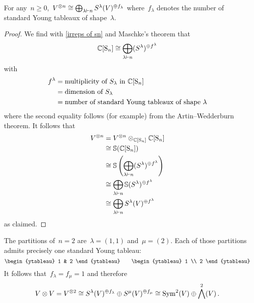 \documentclass[a4paper,10pt]{scrartcl}
\begin{document}
\begin{corollary}
  For any~$n \geq 0$,~$V^{\otimes n} \cong \bigoplus_{\lambda \vdash n} S^{\lambda}(V)^{\oplus f_\lambda}$ where~$f_\lambda$ denotes the number of standard Young tableaux of shape~$\lambda$.
\end{corollary}


\begin{proof}
  We find with \cref{irreps of sn} and Maschke’s theorem that
  \[
    \mathbb{C}[\operatorname{S}_n]
    \cong
    \bigoplus_{\lambda \vdash n} (S^\lambda)^{\oplus f^\lambda}
  \]
  with
  \begin{align*}
    f^\lambda
    &=
    \text{multiplicity of~$S_\lambda$ in~$\mathbb{C}[\operatorname{S}_n]$}
    \\
    &=
    \text{dimension of~$S_\lambda$}
    \\
    &=
    \text{number of standard Young tableaux of shape~$\lambda$}
  \end{align*}
  where the second equality follows (for example) from the Artin--Wedderburn theorem.
  It follows that
  \begin{align*}
    V^{\otimes n}
    &=
    V^{\otimes n} \otimes_{\mathbb{C}[\operatorname{S}_n]} \mathbb{C}[\operatorname{S}_n]
    \\
    &\cong
    \mathbb{S}(\mathbb{C}[\operatorname{S}_n])
    \\
    &\cong
    \mathbb{S}\left( \bigoplus_{\lambda \vdash n} (S^\lambda)^{\oplus f^\lambda} \right)
    \\
    &\cong
    \bigoplus_{\lambda \vdash n} \mathbb{S}(S^\lambda)^{\oplus f^\lambda}
    \\
    &\cong
    \bigoplus_{\lambda \vdash n} S^{\lambda}(V)^{\oplus f^\lambda}
  \end{align*}
  as claimed.
\end{proof}


\begin{example}
  The partitions of~$n = 2$ are~$\lambda = (1,1)$ and~$\mu = (2)$.
  Each of those partitions admits precisely one standard Young tableau:
  \[
    \begin{ytableau}
      1 & 2
    \end{ytableau}
    \qquad
    \begin{ytableau}
      1 \\
      2
    \end{ytableau}
  \]
  It follows that~$f_\lambda = f_\mu = 1$ and therefore
  \[
    V \otimes V
    =
    V^{\otimes 2}
    \cong
    S^{\lambda}(V)^{\oplus f_\lambda}
    \oplus
    S^{\mu}(V)^{\oplus f_\mu}
    \cong
    \operatorname{Sym}^2(V) \oplus \bigwedge^2(V) \,.
  \]
\end{example}
\end{document}
